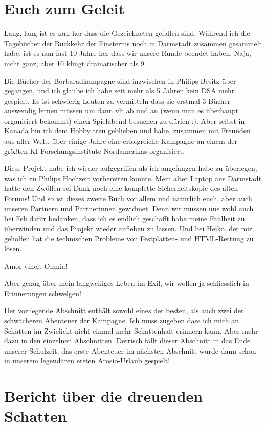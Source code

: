 \chapter{Euch zum Geleit}
Lang, lang ist es nun her dass die Gezeichneten gefallen sind. Während ich die Tagebücher der Rückkehr der Finsternis noch in Darmstadt zusammen gesammelt habe, ist es nun fast 10 Jahre her dass wir unsere Runde beendet haben. Naja, nicht ganz, aber 10 klingt dramatischer als 9.

Die Bücher der Borbaradkampagne sind inzwischen in Philips Besitz über gegangen, und ich glaube ich habe seit mehr als 5 Jahren kein DSA mehr gespielt. Es ist schwierig Leuten zu vermitteln dass sie erstmal 3 Bücher auswendig lernen müssen um dann vlt ab und an (wenn man es überhaupt organisiert bekommt) einen Spielabend besuchen zu dürfen :). Aber selbst in Kanada bin ich dem Hobby treu geblieben und habe, zusammen mit Freunden aus aller Welt, über einige Jahre eine erfolgreiche Kampagne an einem der größten KI Forschungsinstitute Nordamerikas organisiert. 


Diese Projekt habe ich wieder aufgegriffen als ich angefangen habe zu überlegen, was ich zu Philips Hochzeit vorbereiten könnte. Mein alter Laptop aus Darmstadt hatte den Zwölfen sei Dank noch eine komplette Sicherheitskopie des alten Forums! Und so ist dieses zweite Buch vor allem und natürlich euch, aber auch unseren Partnern und Partnerinnen gewidmet. Denn wir müssen uns wohl auch bei Feli dafür bedanken, dass ich es endlich geschafft habe meine Faulheit zu überwinden und das Projekt wieder aufleben zu lassen. Und bei Heiko, der mir geholfen hat die technischen Probleme von Festplatten- und HTML-Rettung zu lösen.

Amor vincit Omnia!

Aber genug über mein langweiliges Leben im Exil, wir wollen ja schliesslich in Erinnerungen schwelgen!

Der vorliegende Abschnitt enthält sowohl eines der besten, als auch zwei der schwächeren Abenteuer der Kampagne.
Ich muss zugeben dass ich mich an Schatten im Zwielicht nicht einmal mehr Schattenhaft erinnern kann. Aber mehr dazu in den einzelnen Abschnitten.
Derrisch fällt dieser Abschnitt in das Ende unserer Schulzeit, das erste Abenteuer im nächsten Abschnitt wurde dann schon in unserem legendären ersten Arosio-Urlaub gespielt!

\chapter{Bericht über die dreuenden Schatten}


